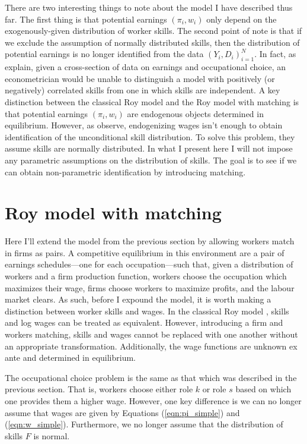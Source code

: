 \documentclass[12 pt]{article}
\begin{document}
There are two interesting things to note about the model I have described thus far. The first thing is that potential earnings $(\pi_i,w_i)$ only depend on the exogenously-given distribution of worker skills. The second point of note is that if we exclude the assumption of normally distributed skills, then the distribution of potential earnings is no longer identified from the data $(Y_i,D_i)_{i=1}^N$. In fact, as \citet{heckman1990empirical} explain, given a cross-section of data on earnings and occupational choice, an econometrician would be unable to distinguish a model with positively (or negatively) correlated skills from one in which skills are independent. A key distinction between the classical Roy model and the Roy model with matching is that potential earnings $(\pi_i,w_i)$ are endogenous objects determined in equilibrium. However, as \citet{heckman1985heterogeneity} observe, endogenizing wages isn't enough to obtain identification of the unconditional skill distribution. To solve this problem, they assume skills are normally distributed. In what I present here I will not impose any parametric assumptions on the distribution of skills. The goal is to see if we can obtain non-parametric identification by introducing matching.

\section{Roy model with matching}

Here I'll extend the model from the previous section by allowing workers match in firms as pairs. A competitive equilibrium in this environment are a pair of earnings schedules---one for each occupation---such that, given a distribution of workers and a firm production function, workers choose the occupation which maximizes their wage, firms choose workers to maximize profits, and the labour market clears. As such, before I expound the model, it is worth making a distinction between worker skills and wages. In the classical Roy model \citep{heckman1990empirical}, skills and log wages can be treated as equivalent. However, introducing a firm and workers matching, skills and wages cannot be replaced with one another without an appropriate transformation. Additionally, the wage functions are unknown ex ante and determined in equilibrium.

The occupational choice problem is the same as that which was described in the previous section. That is, workers choose either role $k$ or role $s$ based on which one provides them a higher wage. However, one key difference is we can no longer assume that wages are given by Equations (\ref{eqn:pi_simple}) and (\ref{eqn:w_simple}). Furthermore, we no longer assume that the distribution of skills $F$ is normal.
\end{document}
